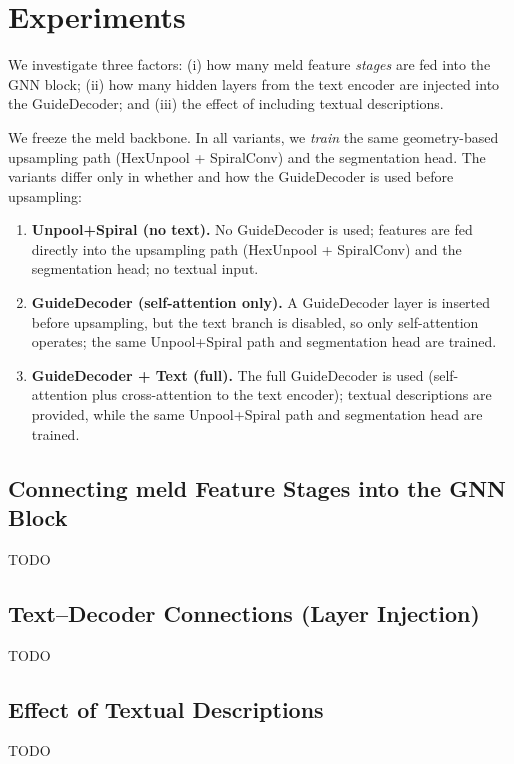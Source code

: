 \documentclass[FCD_GNN.tex]{subfiles}
\begin{document}
\chapter{Experiments}
\label{chapter:Experiments}

We investigate three factors: (i) how many \ac{meld} feature \emph{stages} are fed into the GNN block; (ii) how many hidden layers from the text encoder are injected into the GuideDecoder; and (iii) the effect of including textual descriptions. 

We freeze the \ac{meld} backbone. In all variants, we \emph{train} the same geometry-based upsampling path
(HexUnpool + SpiralConv) and the segmentation head. The variants differ only in whether and how
the GuideDecoder is used before upsampling:

\begin{enumerate}
  \item \textbf{Unpool+Spiral (no text).} No GuideDecoder is used; features are fed directly into the
        upsampling path (HexUnpool + SpiralConv) and the segmentation head; no textual input.
  \item \textbf{GuideDecoder (self-attention only).} A GuideDecoder layer is inserted before upsampling,
        but the text branch is disabled, so only self-attention operates; the same Unpool+Spiral path and
        segmentation head are trained.
  \item \textbf{GuideDecoder + Text (full).} The full GuideDecoder is used (self-attention plus
        cross-attention to the text encoder); textual descriptions are provided, while the same
        Unpool+Spiral path and segmentation head are trained.
\end{enumerate}

\section{Connecting \ac{meld} Feature Stages into the GNN Block}
TODO
\section{Text--Decoder Connections (Layer Injection)}
TODO
\section{Effect of Textual Descriptions}
TODO
\end{document}
